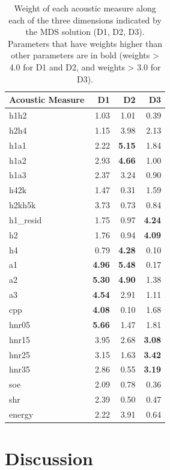 \begin{table}[ht]
    \centering
    \caption{Weight of each acoustic measure along each of the three dimensions indicated by the MDS solution (D1, D2, D3). Parameters that have weights higher than other parameters are in bold (weights > 4.0 for D1 and D2, and weights > 3.0 for D3).} 
    \label{tab:acoustic_correlates}
    \begin{tabular}{lrrr}
    \hline
    Acoustic Measure & D1 & D2 & D3 \\ 
    \hline
    h1h2 & 1.03 & 1.01 & 0.39 \\ 
    h2h4 & 1.15 & 3.98 & 2.13 \\ 
    h1a1 & 2.22 & \textbf{5.15} & 1.84 \\ 
    h1a2 & 2.93 & \textbf{4.66} & 1.00 \\ 
    h1a3 & 2.37 & 3.24 & 0.90 \\ 
    h42k & 1.47 & 0.31 & 1.59 \\ 
    h2kh5k & 3.73 & 0.73 & 0.84 \\ 
    h1\_resid & 1.75 & 0.97 & \textbf{4.24} \\ 
    h2 & 1.76 & 0.94 & \textbf{4.09} \\ 
    h4 & 0.79 & \textbf{4.28} & 0.10 \\ 
    a1 & \textbf{4.96} & \textbf{5.48} & 0.17 \\ 
    a2 & \textbf{5.30} & \textbf{4.90} & 1.38 \\ 
    a3 & \textbf{4.54} & 2.91 & 1.11 \\ 
    cpp & \textbf{4.08} & 0.10 & 1.68 \\ 
    hnr05 & \textbf{5.66} & 1.47 & 1.81 \\ 
    hnr15 & 3.95 & 2.68 & \textbf{3.08} \\ 
    hnr25 & 3.15 & 1.63 & \textbf{3.42} \\ 
    hnr35 & 2.86 & 0.55 & \textbf{3.19} \\ 
    soe & 2.09 & 0.78 & 0.36 \\ 
    shr & 2.39 & 0.50 & 0.47 \\ 
    energy & 2.22 & 3.91 & 0.64 \\ 
    \hline
    \end{tabular}
\end{table}

\section{Discussion} \label{sec:acousticlandscape:discussion}

